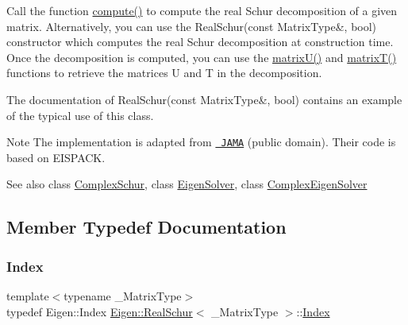 Call the function \mbox{\hyperlink{class_eigen_1_1_real_schur_a60caf9ffad11d728ea458c4dd36d0a98}{compute()}} to compute the real Schur decomposition of a given matrix. Alternatively, you can use the Real\+Schur(const Matrix\+Type\&, bool) constructor which computes the real Schur decomposition at construction time. Once the decomposition is computed, you can use the \mbox{\hyperlink{class_eigen_1_1_real_schur_a85622ccbecff99c8933d21f0a22b22bb}{matrix\+U()}} and \mbox{\hyperlink{class_eigen_1_1_real_schur_abb78996b43b8642a5f507415730445cb}{matrix\+T()}} functions to retrieve the matrices U and T in the decomposition.

The documentation of Real\+Schur(const Matrix\+Type\&, bool) contains an example of the typical use of this class.

\begin{DoxyNote}{Note}
The implementation is adapted from \href{http://math.nist.gov/javanumerics/jama/}{\texttt{ J\+A\+MA}} (public domain). Their code is based on E\+I\+S\+P\+A\+CK.
\end{DoxyNote}
\begin{DoxySeeAlso}{See also}
class \mbox{\hyperlink{class_eigen_1_1_complex_schur}{Complex\+Schur}}, class \mbox{\hyperlink{class_eigen_1_1_eigen_solver}{Eigen\+Solver}}, class \mbox{\hyperlink{class_eigen_1_1_complex_eigen_solver}{Complex\+Eigen\+Solver}} 
\end{DoxySeeAlso}


\subsection{Member Typedef Documentation}
\mbox{\label{class_eigen_1_1_real_schur_a8bd4653e2d9569a44ecc95e746422d3f}} 
\subsubsection{\texorpdfstring{Index}{Index}}
{\footnotesize\ttfamily template$<$typename \+\_\+\+Matrix\+Type$>$ \\
typedef Eigen\+::\+Index \mbox{\hyperlink{class_eigen_1_1_real_schur}{Eigen\+::\+Real\+Schur}}$<$ \+\_\+\+Matrix\+Type $>$\+::\mbox{\hyperlink{class_eigen_1_1_real_schur_a8bd4653e2d9569a44ecc95e746422d3f}{Index}}}

